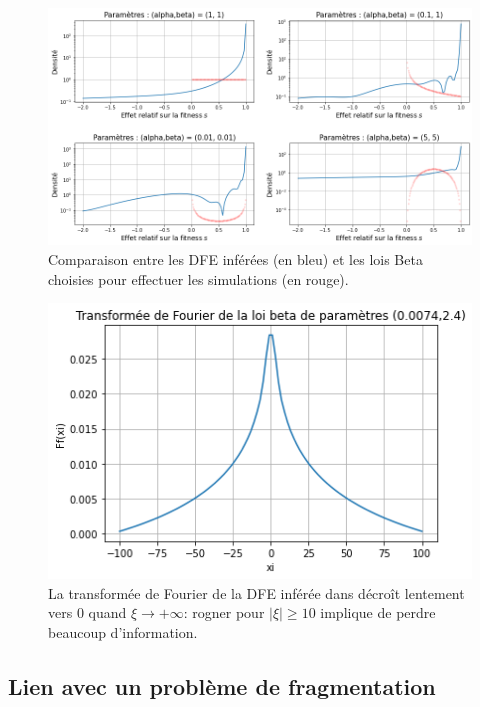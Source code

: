 \documentclass[12pt]{article}
\newcommand{\abs}[1]{\left|#1\right|}
\begin{document}
\begin{figure}[h]
  \begin{center}
    \includegraphics[width=0.9\linewidth]{../Img/DFE_inferred.png}
  \end{center}
  \caption{\label{fig:DFE}Comparaison entre les DFE inférées (en bleu) et les lois Beta choisies pour effectuer les simulations (en rouge).}
\end{figure}


\begin{figure}[h]
  \begin{center}
    \includegraphics[scale=0.6]{./img/four_DFE.png}
  \end{center}
  \caption{\label{fig:DFE_four}La transformée de Fourier de la DFE inférée dans \cite{rob} décroît lentement vers $0$ quand $\xi\to+\infty$: rogner pour $\abs{\xi}\geqslant 10$ implique de perdre beaucoup d'information.}
\end{figure}


\FloatBarrier
\subsection{Lien avec un problème de fragmentation}
\end{document}
